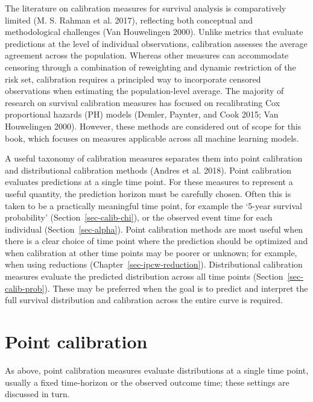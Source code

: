 \documentclass[
  letterpaper,
  krantz2]{style/krantz}
\begin{document}
The literature on calibration measures for survival analysis is
comparatively limited (M. S. Rahman et al. 2017), reflecting both
conceptual and methodological challenges (Van Houwelingen 2000). Unlike
metrics that evaluate predictions at the level of individual
observations, calibration assesses the average agreement across the
population. Whereas other measures can accommodate censoring through a
combination of reweighting and dynamic restriction of the risk set,
calibration requires a principled way to incorporate censored
observations when estimating the population-level average. The majority
of research on survival calibration measures has focused on
recalibrating Cox proportional hazards (PH) models (Demler, Paynter, and
Cook 2015; Van Houwelingen 2000). However, these methods are considered
out of scope for this book, which focuses on measures applicable across
all machine learning models.

A useful taxonomy of calibration measures separates them into point
calibration and distributional calibration methods (Andres et al.
2018). Point
calibration evaluates predictions at a single time point. For these
measures to represent a useful quantity, the prediction horizon must be
carefully chosen. Often this is taken to be a practically meaningful
time point, for example the `5-year survival
probability'
(Section~\ref{sec-calib-chi}), or the observed event time for each
individual (Section~\ref{sec-alpha}). Point calibration methods are most
useful when there is a clear choice of time point where the prediction
should be optimized and when calibration at other time points may be
poorer or unknown; for example, when using reductions
(Chapter~\ref{sec-ipcw-reduction}). Distributional calibration measures
evaluate the predicted distribution across all time points
(Section~\ref{sec-calib-prob}). These may be preferred when the goal is
to predict and interpret the full survival distribution and calibration
across the entire curve is required.

\section{Point calibration}\label{sec-eval-distr-calib-point}

As above, point calibration measures evaluate distributions at a single
time point, usually a fixed time-horizon or the observed outcome time;
these settings are discussed in turn.
\end{document}
